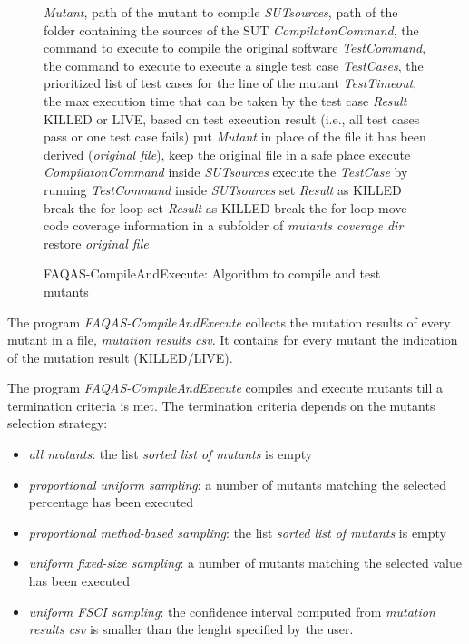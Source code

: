 \begin{figure}[h]
\begin{algorithmic}[1]
\scriptsize
\Require \emph{Mutant}, path of the mutant to compile
\Require \emph{SUTsources}, path of the folder containing the sources of the SUT
\Require \emph{CompilatonCommand}, the command to execute to compile the original software
\Require \emph{TestCommand}, the command to execute to execute a single test case
\Require \emph{TestCases}, the prioritized list of test cases for the line of the mutant
\Require \emph{TestTimeout}, the max execution time that can be taken by the test case
\Ensure \emph{Result} KILLED or LIVE, based on test execution result (i.e., all test cases pass or one test case fails)
\State put \emph{Mutant} in place of the file it has been derived (\emph{original file}), keep the original file in a safe place
\State execute  \emph{CompilatonCommand} inside \emph{SUTsources}
\State execute the \emph{TestCase} by running \emph{TestCommand} inside \emph{SUTsources}
\State set \emph{Result} as KILLED
\State break the for loop
\EndIf
{}
\State set \emph{Result} as KILLED
\State break the for loop
\EndIf
\EndFor
\State move code coverage information in a subfolder of \emph{mutants coverage dir}
\State restore \emph{original file}
\end{algorithmic}
\caption{FAQAS-CompileAndExecute: Algorithm to compile and test mutants}
\label{alg:compileAndExecute}
\end{figure}

\RQ{} The program \emph{FAQAS-CompileAndExecute} collects the mutation results of every mutant in a file, \emph{mutation results csv}. It contains for every mutant the indication of the mutation result (KILLED/LIVE).

\RQ{} The program \emph{FAQAS-CompileAndExecute} compiles and execute mutants till a termination criteria is met. The termination criteria depends on the mutants selection strategy:
\begin{itemize}
\item \emph{all mutants}: the list \emph{sorted list of mutants} is empty
\item \emph{proportional uniform sampling}: a number of mutants matching the selected percentage has been executed
\item \emph{proportional method-based sampling}: the list \emph{sorted list of mutants} is empty
\item \emph{uniform fixed-size sampling}: a number of mutants matching the selected value has been executed
\item \emph{uniform FSCI sampling}: the confidence interval computed from \emph{mutation results csv} is smaller than the lenght specified by the user.
\end{itemize}

